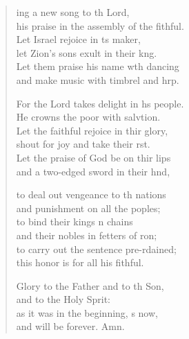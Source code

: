 \settowidth{\versewidth}{his praise in the assembly of the faithful.}
\begin{verse}%
  \begin{patverse}
    ing a new song to th Lord,\Med\\
his praise in the assembly of the fithful.\\
Let Israel rejoice in \pointup{\i}ts maker,\Med\\
let Zion’s sons exult in their k\pointup{\i}ng.\\
Let them praise his name w\pointup{\i}th dancing\Med\\
and make music with timbrel and hrp.

For the Lord takes delight in h\pointup{\i}s people.\Med\\
He crowns the poor with salvtion.\\
Let the faithful rejoice in thir glory,\Med\\
shout for joy and take their rst.\\
Let the praise of God be on thir lips\Med\\
and a two-edged sword in their hnd,

to deal out vengeance to th nations\Med\\
and punishment on all the poples;\\
to bind their kings \pointup{\i}n chains\Med\\
and their nobles in fetters of \pointup{\i}ron;\\
to carry out the sentence pre-rdained;\Med\\
this honor is for all his fithful.

Glory to the Father and to th Son,\Med\\
and to the Holy Sp\pointup{\i}rit:\\
as it was in the beginning, \pointup{\i}s now,\Med\\
and will be forever. Amn.
  \end{patverse}
\end{verse}
